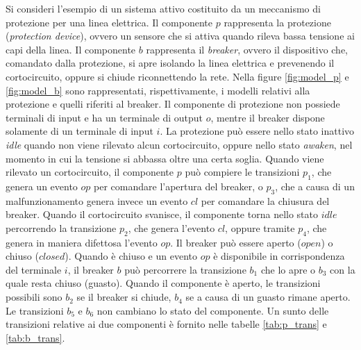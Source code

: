 \begin{ex}\label{ex:modelli}
Si consideri l'esempio di un sistema attivo costituito da un meccanismo di protezione per una linea elettrica. Il componente $p$ rappresenta la protezione (\emph{protection device}), ovvero un sensore che si attiva quando rileva bassa tensione ai capi della linea. Il componente $b$ rappresenta il \emph{breaker}, ovvero il dispositivo che, comandato dalla protezione, si apre isolando la linea elettrica e prevenendo il cortocircuito, oppure si chiude riconnettendo la rete. Nella figure \ref{fig:model_p} e \ref{fig:model_b}  sono rappresentati, rispettivamente, i modelli relativi alla protezione e quelli riferiti al breaker.
Il componente di protezione non possiede terminali di input e ha un terminale di output $o$, mentre il breaker dispone solamente di un terminale di input $i$.
La protezione può essere nello stato inattivo \emph{idle} quando non viene rilevato alcun cortocircuito, oppure nello stato \emph{awaken}, nel momento in cui la tensione si abbassa oltre una certa soglia. Quando viene rilevato un cortocircuito, il componente $p$ può compiere le transizioni $p_1$, che genera un evento $op$ per comandare l'apertura del breaker, o $p_3$, che a causa di un malfunzionamento genera invece un evento $cl$ per comandare la chiusura del breaker. Quando il cortocircuito svanisce, il componente torna nello stato $idle$ percorrendo la transizione $p_2$, che genera l'evento $cl$, oppure tramite $p_4$, che genera in maniera difettosa l'evento $op$.
Il breaker può essere aperto ($open$) o chiuso ($closed$). Quando è chiuso e un evento $op$ è disponibile in corrispondenza del terminale $i$, il breaker $b$ può percorrere la transizione $b_1$ che lo apre o $b_3$ con la quale resta chiuso (guasto). Quando il componente è aperto, le transizioni possibili sono $b_2$ se il breaker si chiude, $b_4$ se a causa di un guasto rimane aperto. Le transizioni $b_5$ e $b_6$ non cambiano lo stato del componente.
Un sunto delle transizioni relative ai due componenti è fornito nelle tabelle \ref{tab:p_trans} e \ref{tab:b_trans}.
\end{ex}

